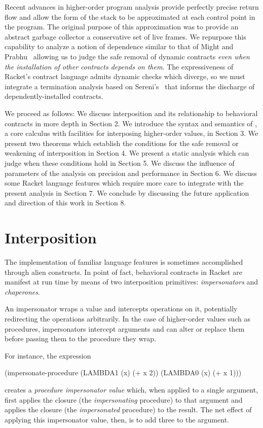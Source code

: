 \documentclass{sigplanconf}
\begin{document}
Recent advances in higher-order program analysis \cite{earl2012introspective} provide perfectly precise return flow and allow the form of the stack to be approximated at each control point in the program.
The original purpose of this approximation was to provide an abstract garbage collector a conservative set of live frames.
We repurpose this capability to analyze a notion of dependence similar to that of Might and Prabhu~\cite{might2009interprocedural} allowing us to judge the safe removal of dynamic contracts \emph{even when the installation of other contracts depends on them}.
The expressiveness of Racket's contract language admits dynamic checks which diverge, so we must integrate a termination analysis based on Sereni's~\cite{sereni2007termination} that informs the discharge of dependently-installed contracts.

We proceed as follows:
We discuss interposition and its relationship to behavioral contracts in more depth in Section 2.
We introduce the syntax and semantics of \chapcalc, a core calculus with facilities for interposing higher-order values, in Section 3.
We present two theorems which establish the conditions for the safe removal or weakening of interposition in Section 4.
We present a static analysis which can judge when these conditions hold in Section 5.
We discuss the influence of parameters of the analysis on precision and performance in Section 6.
We discuss some Racket language features which require more care to integrate with the present analysis in Section 7.
We conclude by discussing the future application and direction of this work in Section 8.


\section{Interposition}

The implementation of familiar language features is sometimes accomplished through alien constructs.
In point of fact, behavioral contracts in Racket are manifest at run time by means of two interposition primitives: \emph{impersonators} and \emph{chaperones}.

An impersonator wraps a value and intercepts operations on it, potentially redirecting the operations arbitrarily.
In the case of higher-order values such as procedures, impersonators intercept arguments and can alter or replace them before passing them to the procedure they wrap.

For instance, the expression
\begin{schemedisplay}
(impersonate-procedure (LAMBDA1 (x) (+ x 2)) (LAMBDA0 (x) (+ x 1)))
\end{schemedisplay}
creates a \emph{procedure impersonator value} which, when applied to a single argument, first applies the  closure (the \emph{impersonating} procedure) to that argument and applies the  closure (the \emph{impersonated} procedure) to the result.
The net effect of applying this impersonator value, then, is to add three to the argument.
\end{document}
